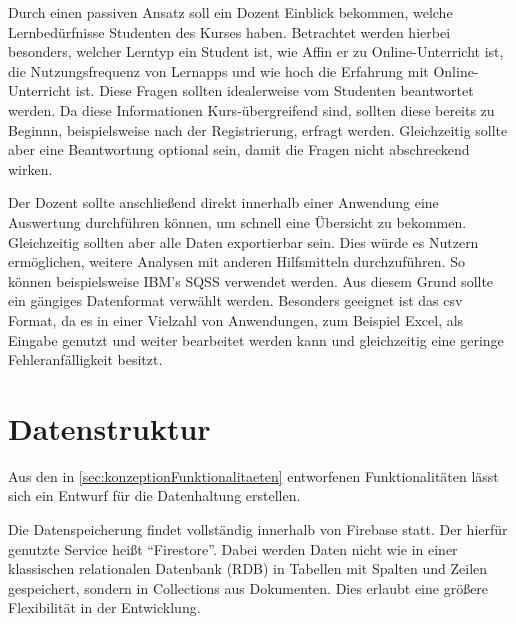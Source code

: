 Durch einen passiven Ansatz soll ein Dozent Einblick bekommen, welche Lernbedürfnisse Studenten des Kurses haben.
Betrachtet werden hierbei besonders, welcher Lerntyp ein Student ist, wie Affin er zu Online-Unterricht ist, die Nutzungsfrequenz von Lernapps und wie hoch die Erfahrung mit Online-Unterricht ist.
Diese Fragen sollten idealerweise vom Studenten beantwortet werden. Da diese Informationen Kurs-übergreifend sind, sollten diese bereits zu Beginnn, beispielsweise nach der Registrierung, erfragt werden.
Gleichzeitig sollte aber eine Beantwortung optional sein, damit die Fragen nicht abschreckend wirken.

Der Dozent sollte anschließend direkt innerhalb einer Anwendung eine Auswertung durchführen können, um schnell eine Übersicht zu bekommen. Gleichzeitig sollten aber alle Daten exportierbar sein. Dies würde es Nutzern ermöglichen, weitere Analysen mit anderen Hilfsmitteln durchzuführen. So können beispielsweise IBM's SQSS verwendet werden.
Aus diesem Grund sollte ein gängiges Datenformat verwählt werden. 
Besonders geeignet ist das csv Format, da es in einer Vielzahl von Anwendungen, zum Beispiel Excel, als Eingabe genutzt und weiter bearbeitet werden kann und gleichzeitig eine geringe Fehleranfälligkeit besitzt.




























\section{Datenstruktur}
Aus den in \autoref{sec:konzeptionFunktionalitaeten} entworfenen Funktionalitäten lässt sich ein Entwurf für die Datenhaltung erstellen.

Die Datenspeicherung findet vollständig innerhalb von Firebase statt.
Der hierfür genutzte Service heißt \enquote{Firestore}.
Dabei werden Daten nicht wie in einer klassischen relationalen Datenbank (\ac{RDB}) in Tabellen mit Spalten und Zeilen gespeichert, sondern in Collections aus Dokumenten. Dies erlaubt eine größere Flexibilität in der Entwicklung.


